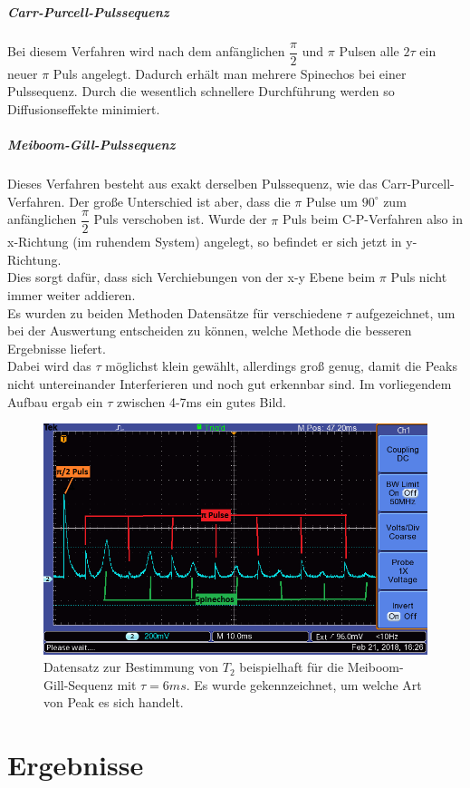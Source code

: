 \documentclass[12pt,a4paper]{article}
\begin{document}
\subparagraph{Carr-Purcell-Pulssequenz}
Bei diesem Verfahren wird nach dem anfänglichen $\dfrac{\pi}{2}$ und $\pi$ Pulsen alle  $2 \tau$ ein neuer $\pi$ Puls angelegt. Dadurch erhält man mehrere Spinechos bei einer Pulssequenz. Durch die wesentlich schnellere Durchführung werden so Diffusionseffekte minimiert.
\subparagraph{Meiboom-Gill-Pulssequenz}
Dieses Verfahren besteht aus exakt derselben Pulssequenz, wie das Carr-Purcell-Verfahren. Der große Unterschied ist aber, dass  die $\pi$ Pulse um $90^{\circ}$ zum anfänglichen $\dfrac{\pi}{2}$ Puls verschoben ist. Wurde der $\pi$ Puls beim C-P-Verfahren also in x-Richtung (im ruhendem System) angelegt, so befindet er sich jetzt in y-Richtung.\\
Dies sorgt dafür, dass sich Verchiebungen von der x-y Ebene beim $\pi$ Puls nicht immer weiter addieren.
\\
Es wurden zu beiden Methoden Datensätze für verschiedene $\tau$ aufgezeichnet, um bei der Auswertung entscheiden zu können, welche Methode die besseren Ergebnisse liefert.\\
Dabei wird das $\tau$ möglichst klein gewählt, allerdings groß genug, damit die Peaks nicht untereinander Interferieren und noch gut erkennbar sind. Im vorliegendem Aufbau ergab ein $\tau$ zwischen 4-7ms ein gutes Bild.\\

\begin{figure}
\centering
\includegraphics[scale=0.8]{Bilder/T2Beispiel.png}
\caption{Datensatz zur Bestimmung von $T_2$ beispielhaft für die Meiboom-Gill-Sequenz mit $\tau = 6ms$. Es wurde gekennzeichnet, um welche Art von Peak es sich handelt. }
\label{fig:T2Beispiel}
\end{figure}


\section{Ergebnisse}
\end{document}
